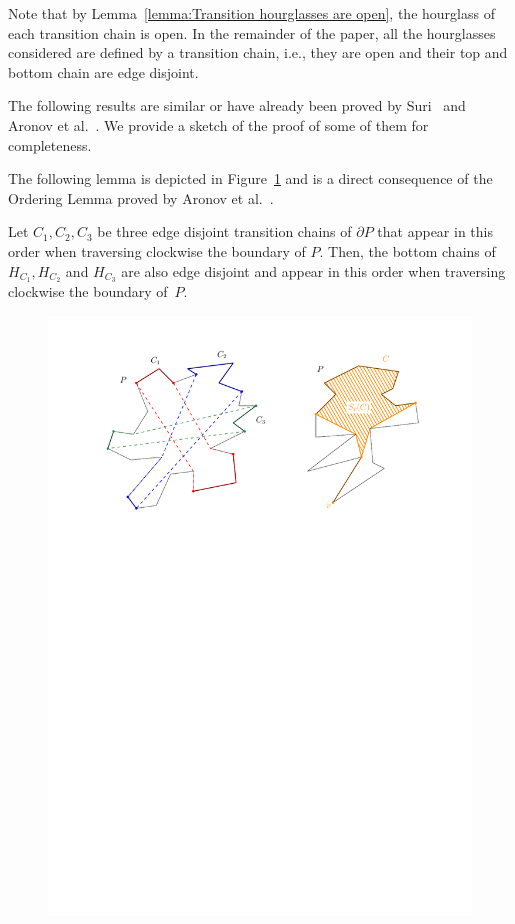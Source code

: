 \documentclass[a4paper,UKenglish]{lipics}
\begin{document}
Note that by Lemma~\ref{lemma:Transition hourglasses are open}, the hourglass of each transition chain is open.
In the remainder of the paper, all the hourglasses considered are defined by a transition chain, i.e., they are open and their top and bottom chain are edge disjoint.

The following results are similar or have already been proved by Suri~\cite{suri1989computing} and Aronov et al.~\cite{aronov1993furthest}. We provide a sketch of the proof of some of them for completeness.

The following lemma is depicted in Figure~\ref{fig:Order Lemma And Funnels} and is a direct consequence of the Ordering Lemma proved by Aronov et al.~\cite[Corollary 2.7.4]{aronov1993furthest}.
\begin{lemma}\label{lemma:Ordering Lemma}
Let $C_1, C_2, C_3$ be three edge disjoint transition chains of $\partial P$ that appear in this order when traversing clockwise the boundary of $P$. Then, the bottom chains of $H_{C_1}, H_{C_2}$ and $H_{C_3}$ are also edge disjoint and appear in this order when traversing clockwise the boundary of~$P$.
\end{lemma}

\begin{figure}[tb]
\centering
\includegraphics[width=1\textwidth]{img/OrderAndFunnel.pdf}
\caption{\small }
\label{fig:Order Lemma And Funnels}
\end{figure}
\end{document}
